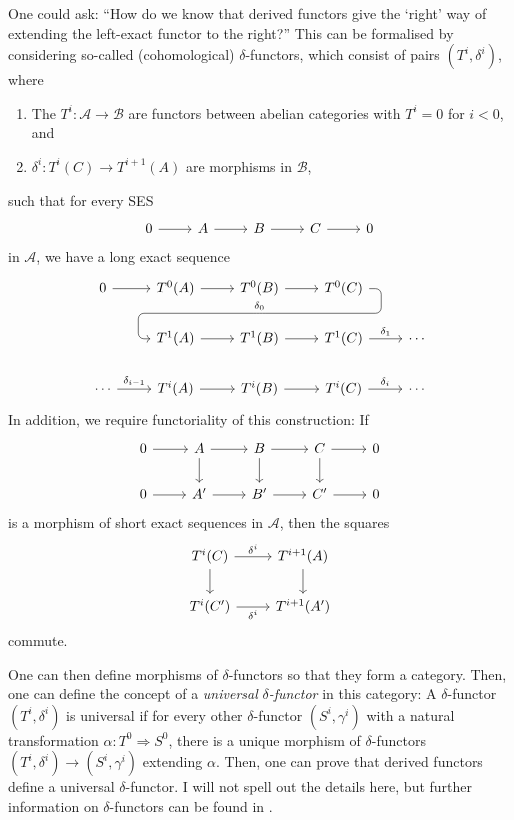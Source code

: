 \begin{bcat}
  One could ask: ``How do we know that derived functors give the `right'
  way of extending the left-exact functor to the right?'' This can be
  formalised by considering so-called (cohomological) $\delta$-functors,
  which consist of pairs $(T^{i},\delta^{i})$, where
  \begin{enumerate}
    \item The $T^{i}:\mathcal{A}\to\mathcal{B}$ are functors between abelian
          categories with $T^{i}=0$ for $i<0$, and
    \item $\delta^{i}:T^{i}(C)\to T^{i+1}(A)$ are morphisms in $\mathcal{B}$,
  \end{enumerate}
  such that for every SES
  \[\begin{tikzcd}
      0\rar & A\rar & B\rar & C\rar & 0
    \end{tikzcd}\]
  in $\mathcal{A}$, we have a long exact sequence
  \[\begin{tikzcd}
      0\rar & T^{0}(A)\rar & T^{0}(B)\rar\dar[phantom, ""{coordinate, name=Z}]
      & T^{0}(C)\arrow[rounded corners, to path={[pos=0] --
      ([xshift=2ex]\tikztostart.east) |- (Z) -|
      ([xshift=-2ex]\tikztotarget.west)\tikztonodes -- (\tikztotarget)},
    "\delta_{0}"']{dll} & \\
    & T^{1}(A)\rar & T^{1}(B)\rar & T^{1}(C)\rar{\delta_{1}} & \cdots \\
    \cdots \rar{\delta_{i-1}}& T^{i}(A)\rar & T^{i}(B)\rar
    & T^{i}(C)\rar{\delta_{i}} & \cdots
    \end{tikzcd}\]
  In addition, we require functoriality of this construction: If
  \[\begin{tikzcd}
      0\rar & A\rar\dar & B\rar\dar & C\rar\dar & 0 \\
      0\rar & A^{\prime}\rar & B^{\prime}\rar & C^{\prime}\rar & 0
    \end{tikzcd}\]
  is a morphism of short exact sequences in $\mathcal{A}$, then the
  squares
  \[\begin{tikzcd}
      T^{i}(C)\rar{\delta^{i}}\dar & T^{i+1}(A)\dar \\
      T^{i}(C^{\prime})\arrow["\delta^{i}"']{r} & T^{i+1}(A^{\prime})
    \end{tikzcd}\]
  commute.

  One can then define morphisms of $\delta$-functors so that they form
  a category. Then, one can define the concept of a \emph{universal}
  $\delta$\emph{-functor} in this category: A $\delta$-functor
  $(T^{i},\delta^{i})$ is universal if for every other $\delta$-functor
  $(S^{i},\gamma^{i})$ with a natural transformation
  $\alpha: T^{0}\Rightarrow S^{0}$, there is a unique morphism of
  $\delta$-functors $(T^{i},\delta^{i})\to (S^{i},\gamma^{i})$ extending
  $\alpha$. Then, one can prove that derived functors define a universal
  $\delta$-functor. I will not spell out the details here, but further
  information on $\delta$-functors can be found in \cite{vakil}.
\end{bcat}
